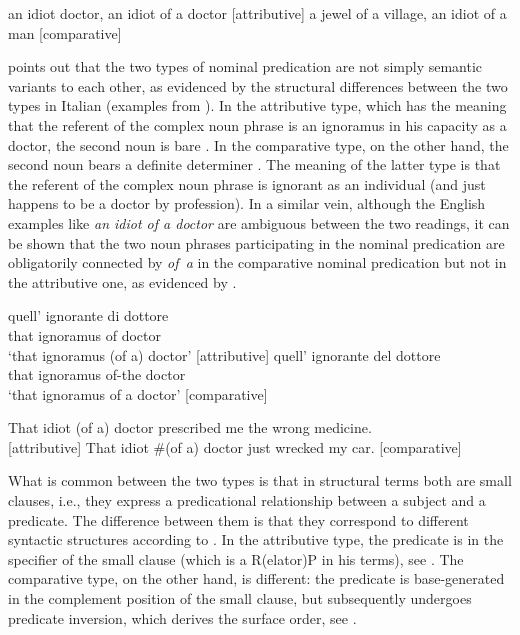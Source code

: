 \documentclass[output=paper]{langscibook}
\begin{document}
\ea 
\ea 
an idiot doctor, an idiot of a doctor \hfill [attributive]
\ex a jewel of a village, an idiot of a man \hfill [comparative]
\z
\z

\noindent {} points out that the two types of nominal predication are not simply semantic variants to each other, as evidenced by the structural differences between the two types in Italian (examples from \citealt{Napoli1989}). In the attributive type, which has the meaning that the referent of the complex noun phrase is an ignoramus in his capacity as a doctor, the second noun is bare . In the comparative type, on the other hand, the second noun bears a definite determiner . The meaning of the latter type is that the referent of the complex noun phrase is ignorant as an individual (and just happens to be a doctor by profession). In a similar vein, although the English examples like \emph{an idiot of a doctor} are ambiguous between the two readings, it can be shown that the two noun phrases participating in the nominal predication are obligatorily connected by \emph{of~a} in the comparative nominal predication but not in the attributive one, as evidenced by  \citep[164]{denDikken2006}.

\ea
\ea \label{ge-ex-it1}
\gll quell’ ignorante di dottore  \\
that ignoramus of doctor \\
\glt `that ignoramus (of a) doctor' \hfill [attributive] 
\ex \label{ge-ex-it2}
\gll quell’ ignorante del dottore \\
that ignoramus of-the doctor \\ 
\glt `that ignoramus of a doctor'  \hfill [comparative]
\z
\z

\ea \label{ge-ex-engcopdrop}
\ea 
That idiot (of a) doctor prescribed me the wrong medicine. \hfill  \\ \phantom{} \hfill [attributive]
\ex That idiot \#(of a) doctor just wrecked my car. \hfill [comparative]
\z
\z

\noindent What is common between the two types is that in structural terms both are small clauses, i.e., they express a predicational relationship between a subject and a predicate. The difference between them is that they correspond to different syntactic structures according to \citet{denDikken2006}. In the attributive type, the predicate is in the specifier of the small clause (which is a R(elator)P in his terms), see . The comparative type, on the other hand, is different: the predicate is base-generated in the complement position of the small clause, but subsequently undergoes predicate inversion, which derives the surface order, see . 
\end{document}
